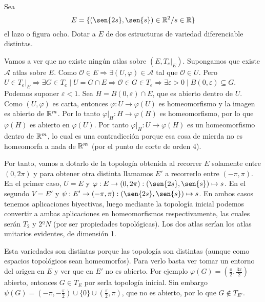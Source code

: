 \documentclass[twoside]{article}
\begin{document}
\begin{ejercicio}{3}
Sea
$$E = \{ (\sen{2s}, \sen{s})\in \R^2 / s\in \R\}$$ 
el lazo o figura ocho. Dotar a $E$ de dos estructuras de variedad diferenciable
distintas.
\end{ejercicio}
\begin{solucion}
Vamos a ver que no existe ningún atlas sobre $(E,T_e|_E)$. Supongamos que existe $\mathcal{A}$ atlas sobre $E$. Como $\mathcal{O}\in E\Rightarrow \exists(U,\varphi)\in\mathcal{A}$ tal que $\mathcal{O}\in U$. Pero $U\in T_e|_E\Rightarrow \exists G\in T_e\mid U=G\cap E\Rightarrow \mathcal{O}\in G\in T_e\Rightarrow \exists\varepsilon>0\mid B(0,\varepsilon)\subseteq G$. Podemos suponer $\varepsilon<1$. Sea $H=B(0,\varepsilon)\cap E$, que es abierto dentro de $U$. Como $(U,\varphi)$ es carta, entonces $\varphi:U\to\varphi(U)$ es homeomorfismo y la imagen es abierto de $\mathbb{R}^m$. Por lo tanto $\varphi|_H: H\to\varphi(H)$ es homeomorfismo, por lo que $\varphi(H)$ es abierto en $\varphi(U)$. Por tanto $\varphi|_H:U\to\varphi(H)$ es un homeomorfismo dentro de $\mathbb{R}^m$, lo cual es una contradicción porque esa cosa de mierda no es homeomorfa a nada de $\mathbb{R}^m$ (por el punto de corte de orden 4).

Por tanto, vamos a dotarlo de la topología obtenida al recorrer $E$ solamente entre $(0,2\pi)$ y para obtener otra distinta llamamos $E'$ a recorrerlo entre $(-\pi,\pi)$. En el primer caso, $U=E$ y $\varphi:E\to (0,2\pi): (\sen{2s},\sen{s})\mapsto s$. En el segundo $V=E'$ y $\psi:E'\to(-\pi,\pi):(\sen{2s},\sen{s})\mapsto s$. En ambos casos tenemos aplicaciones biyectivas, luego mediante la topología inicial podemos convertir a ambas aplicaciones en homeomorfismos respectivamente, las cuales serán $T_2$ y $2ºN$ (por ser propiedades topológicas). Los dos atlas serían los atlas unitarios evidentes, de dimensión 1. 

Esta variedades son distintas porque las topología son distintas (aunque como espacios topológicos sean homeomorfos). Para verlo basta ver tomar un entorno del origen en $E$ y ver que en $E'$ no es abierto. Por ejemplo $\varphi(G)=(\frac{\pi}{2},\frac{3\pi}{2})$ abierto, entonces $G\in T_E$ por serla topología inicial. Sin embargo $\psi(G)=(-\pi,-\frac{\pi}{2})\cup\{0\}\cup(\frac{\pi}{2},\pi)$, que no es abierto, por lo que $G\notin T_{E'}$. 
\end{solucion}

\newpage
\end{document}
